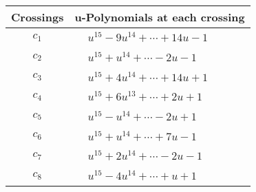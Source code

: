 \documentclass[1p]{elsarticle_modified}
\theoremstyle{definition}
\begin{document}
\begin{tabular}{m{50pt}|m{274pt}}
Crossings & \hspace{64pt}u-Polynomials at each crossing \\
\hline $$\begin{aligned}c_{1}\end{aligned}$$&$\begin{aligned}
&u^{15}-9 u^{14}+\cdots+14 u-1
\end{aligned}$\\
\hline $$\begin{aligned}c_{2}\end{aligned}$$&$\begin{aligned}
&u^{15}+u^{14}+\cdots-2 u-1
\end{aligned}$\\
\hline $$\begin{aligned}c_{3}\end{aligned}$$&$\begin{aligned}
&u^{15}+4 u^{14}+\cdots+14 u+1
\end{aligned}$\\
\hline $$\begin{aligned}c_{4}\end{aligned}$$&$\begin{aligned}
&u^{15}+6 u^{13}+\cdots+2 u+1
\end{aligned}$\\
\hline $$\begin{aligned}c_{5}\end{aligned}$$&$\begin{aligned}
&u^{15}- u^{14}+\cdots-2 u+1
\end{aligned}$\\
\hline $$\begin{aligned}c_{6}\end{aligned}$$&$\begin{aligned}
&u^{15}+u^{14}+\cdots+7 u-1
\end{aligned}$\\
\hline $$\begin{aligned}c_{7}\end{aligned}$$&$\begin{aligned}
&u^{15}+2 u^{14}+\cdots-2 u-1
\end{aligned}$\\
\hline $$\begin{aligned}c_{8}\end{aligned}$$&$\begin{aligned}
&u^{15}-4 u^{14}+\cdots+u+1
\end{aligned}$\\

\end{tabular}
\end{document}
